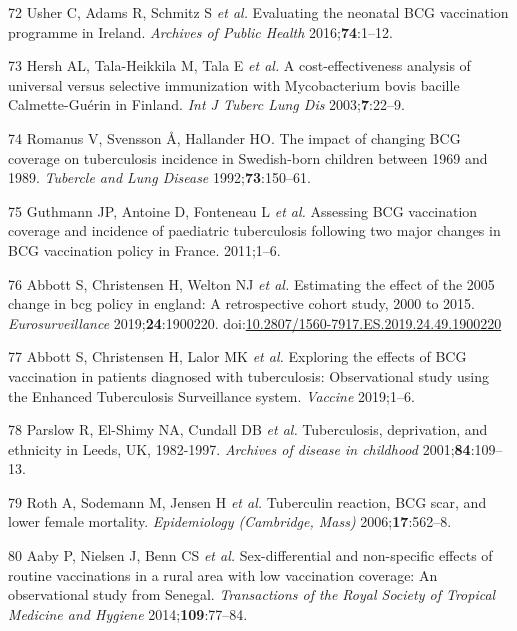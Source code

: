 \documentclass[11pt,twoside]{bristolthesis}
\begin{document}
  \leavevmode\hypertarget{ref-Usher2016}{}%
  72 Usher C, Adams R, Schmitz S \emph{et al.} Evaluating the neonatal BCG vaccination programme in Ireland. \emph{Archives of Public Health} 2016;\textbf{74}:1--12.
  
  \leavevmode\hypertarget{ref-Hersh2003}{}%
  73 Hersh AL, Tala-Heikkila M, Tala E \emph{et al.} A cost-effectiveness analysis of universal versus selective immunization with Mycobacterium bovis bacille Calmette-Guérin in Finland. \emph{Int J Tuberc Lung Dis} 2003;\textbf{7}:22--9.
  
  \leavevmode\hypertarget{ref-Romanus1992}{}%
  74 Romanus V, Svensson Å, Hallander HO. The impact of changing BCG coverage on tuberculosis incidence in Swedish-born children between 1969 and 1989. \emph{Tubercle and Lung Disease} 1992;\textbf{73}:150--61.
  
  \leavevmode\hypertarget{ref-Guthmann2011}{}%
  75 Guthmann JP, Antoine D, Fonteneau L \emph{et al.} Assessing BCG vaccination coverage and incidence of paediatric tuberculosis following two major changes in BCG vaccination policy in France. 2011;1--6.
  
  \leavevmode\hypertarget{ref-Abbott567511}{}%
  76 Abbott S, Christensen H, Welton NJ \emph{et al.} Estimating the effect of the 2005 change in bcg policy in england: A retrospective cohort study, 2000 to 2015. \emph{Eurosurveillance} 2019;\textbf{24}:1900220. doi:\href{https://doi.org/10.2807/1560-7917.ES.2019.24.49.1900220}{10.2807/1560-7917.ES.2019.24.49.1900220}
  
  \leavevmode\hypertarget{ref-Abbott:2019ir}{}%
  77 Abbott S, Christensen H, Lalor MK \emph{et al.} Exploring the effects of BCG vaccination in patients diagnosed with tuberculosis: Observational study using the Enhanced Tuberculosis Surveillance system. \emph{Vaccine} 2019;1--6.
  
  \leavevmode\hypertarget{ref-Parslow2001}{}%
  78 Parslow R, El-Shimy NA, Cundall DB \emph{et al.} Tuberculosis, deprivation, and ethnicity in Leeds, UK, 1982-1997. \emph{Archives of disease in childhood} 2001;\textbf{84}:109--13.
  
  \leavevmode\hypertarget{ref-Roth2006a}{}%
  79 Roth A, Sodemann M, Jensen H \emph{et al.} Tuberculin reaction, BCG scar, and lower female mortality. \emph{Epidemiology (Cambridge, Mass)} 2006;\textbf{17}:562--8.
  
  \leavevmode\hypertarget{ref-Aaby2014}{}%
  80 Aaby P, Nielsen J, Benn CS \emph{et al.} Sex-differential and non-specific effects of routine vaccinations in a rural area with low vaccination coverage: An observational study from Senegal. \emph{Transactions of the Royal Society of Tropical Medicine and Hygiene} 2014;\textbf{109}:77--84.
  
\end{document}
